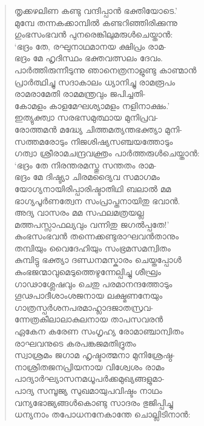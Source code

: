 \begin{verse}
തൃക്കഴലിണ കണ്ടു വന്ദിപ്പാന്‍ ഭക്തിയോടെ.’\\
മുമ്പേ തന്നകക്കാമ്പില്‍ കണ്ടറിഞ്ഞിരിക്കുന്നു\\
ഗുംഭസംഭവന്‍ പുനരെങ്കിലുമരുള്‍ചെയ്താന്‍:\\
‘ഭദ്രം തേ, രഘുനാഥമാനയ ക്ഷിപ്രം രാമ-\\
ഭദ്രം മേ ഹൃദിസ്ഥം ഭക്തവത്സലം ദേവം.\\
പാര്‍ത്തിരുന്നീടുന്നു ഞാനെത്രനാളുണ്ടു കാണ്മാന്‍\\
പ്രാര്‍ത്ഥിച്ചു സദാകാലം ധ്യാനിച്ചു രാമരൂപം\\
രാമരാമേതി രാമമന്ത്രവും ജപിച്ചതി-\\
കോമളം കാളമേഘശ്യാമളം നളിനാക്ഷം.’\\
ഇത്യുക്ത്വാ സരഭസമുത്ഥായ മുനിപ്രവ-\\
രോത്തമന്‍ മദ്ധ്യേ ചിത്തമത്യന്തഭക്ത്യാ മുനി-\\
സത്തമരോടും നിജശിഷ്യസഞ്ചയത്തോടും\\
ഗത്വാ ശ്രീരാമചന്ദ്രവക്ത്രം പാര്‍ത്തരുള്‍ചെയ്താന്‍:\\
‘ഭദ്രം തേ നിരന്തരമസ്തു സന്തതം രാമ-\\
ഭദ്രം മേ ദിഷ്ട്യാ ചിരമദ്യൈവ സമാഗമം\\
യോഗ്യനായിരിപ്പാരിഷ്ടാതിഥി ബലാല്‍ മമ\\
ഭാഗ്യപൂര്‍ണത്വേന സംപ്രാപ്തനായിതു ഭവാന്‍.\\
അദ്യ വാസരം മമ സഫലമത്രയല്ല\\
മത്തപസ്സാഫല്യവും വന്നിതു ജഗല്‍പ്പതേ!’\\
കുംഭസംഭവന്‍ തന്നെക്കണ്ടുരാഘവന്‍താനും\\
തമ്പിയും വൈദേഹിയും സംഭ്രമസമന്വിതം\\
കുമ്പിട്ടു ഭക്ത്യാ ദണ്ഡനമസ്കാരം ചെയ്തപ്പോള്‍\\
കുംഭജന്മാവുമെടുത്തെഴുന്നേല്പിച്ചു ശീഘ്രം\\
ഗാഢാശ്ലേഷവും ചെതു പരമാനന്ദത്തോടും\\
ഗൂഢപാദീശാംശജനായ ലക്ഷ്മണനേയും\\
ഗാത്രസ്പര്‍ശനപരമാഹ്ലാദജാതസ്രവ-\\
ന്നേത്രകീലാലാകുലനായ താപസവരന്‍\\
ഏകേന കരേണ സംഗൃഹ്യ രോമാഞ്ചാന്വിതം\\
രാഘവനുടെ കരപങ്കജമതിദ്രുതം\\
സ്വാശ്രമം ജഗാമ ഹൃഷ്ടാത്മനാ മുനിശ്രേഷ്ഠ-\\
നാശ്രിതജനപ്രിയനായ വിശ്വേശം രാമം\\
പാദ്യാര്‍ഘ്യാസനമധൂപര്‍ക്കമുഖ്യങ്ങളുമാ-\\
പാദ്യ സമ്പൂജ്യ സുഖമായുപവിഷ്ടം നാഥം\\
വന്യഭോജ്യങ്ങള്‍കൊണ്ടു സാദരം ഭുജിപ്പിച്ചു\\
ധന്യനാം തപോധനനേകാന്തേ ചൊല്ലിടിനാന്‍:
\end{verse}

